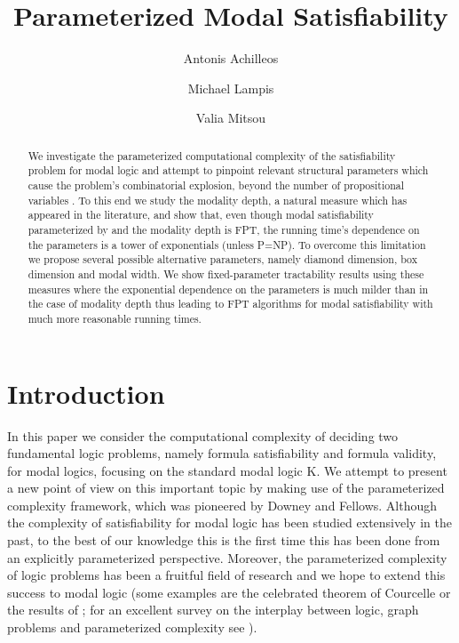\documentclass{llncs}
\begin{document}
\title{Parameterized Modal Satisfiability}

\author{Antonis Achilleos \and Michael Lampis \and Valia Mitsou}



\maketitle

\begin{abstract}
We investigate the parameterized computational complexity of the
satisfiability problem for modal logic and attempt to pinpoint
relevant structural parameters which cause the problem's
combinatorial explosion, beyond the number of propositional
variables . To this end we study the modality depth, a natural
measure which has appeared in the literature, and show that, even
though modal satisfiability parameterized by  and the modality
depth is FPT, the running time's dependence on the parameters is a
tower of exponentials (unless P=NP). To overcome this limitation we
propose several possible alternative parameters, namely diamond
dimension, box dimension and modal width. We show fixed-parameter
tractability results using these measures where the exponential
dependence on the parameters is much milder than in the case of
modality depth thus leading to FPT algorithms for modal
satisfiability with much more reasonable running times.

\end{abstract}


\section{Introduction}

In this paper we consider the computational complexity of deciding
two fundamental logic problems, namely formula satisfiability and
formula validity, for modal logics, focusing on the standard modal
logic K. We attempt to present a new point of view on this important
topic by making use of the parameterized complexity framework, which
was pioneered by Downey and Fellows. Although the complexity of
satisfiability for modal logic has been studied extensively in the
past, to the best of our knowledge this is the first time this has
been done from an explicitly parameterized perspective. Moreover,
the parameterized complexity of logic problems has been a fruitful
field of research and we hope to extend this success to modal logic
(some examples are the celebrated theorem of Courcelle
\cite{DBLP:journals/iandc/Courcelle90} or the results of
\cite{DBLP:journals/apal/FrickG04}; for an excellent survey on the interplay
between logic, graph problems and parameterized complexity see
\cite{DBLP:journals/eccc/Grohe07}).
\end{document}
